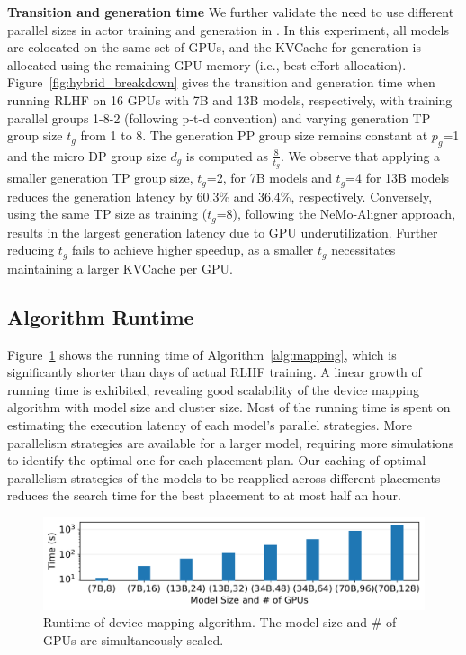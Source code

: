 \vspace{0.5mm}
\noindent \textbf{%
Transition and generation time}
We further validate the need to use different parallel sizes in actor training and generation in \sysname{}. In this experiment, all models are colocated on the same set of GPUs, and the KVCache for generation is allocated using the remaining GPU memory (i.e., best-effort allocation).
Figure~\ref{fig:hybrid_breakdown} gives the transition and generation time when running RLHF on 16 GPUs with 7B and 13B models, respectively, with training parallel groups 1-8-2 (following p-t-d convention) and varying generation TP group size $t_g$ from 1 to 8. 
The generation PP group size remains constant at $p_g$=1 and the micro DP group size $d_g$ is computed as $\frac{8}{t_g}$.
We observe that applying a smaller generation TP group size, $t_g$=2, for 7B models and $t_g$=4 for 13B models reduces the generation latency by 60.3\% and 36.4\%, respectively.
Conversely, using the same TP size as training ($t_g$=8), following the NeMo-Aligner approach, results in the largest generation latency due to GPU underutilization.
Further reducing $t_g$ fails to achieve higher speedup, as a smaller $t_g$ 
necessitates maintaining a larger KVCache per GPU.







\vspace{-1mm}
\subsection{Algorithm Runtime}
Figure~\ref{fig:exp_algo_time} shows the running time of Algorithm~\ref{alg:mapping}, 
which is significantly shorter than days of actual RLHF training. %
A linear growth of running time is exhibited, revealing good scalability of the device mapping algorithm with %
model size and cluster size. Most of the running time is spent on estimating the execution latency of each model's parallel strategies. More parallelism strategies are available for a larger model, requiring more simulations to identify the optimal one for each placement plan. %
Our caching of optimal parallelism strategies of the models to be reapplied across different placements reduces the search time for the best placement %
to at most half an hour.






\begin{figure}[t]
    \centering
    \includegraphics[width=.95\linewidth]{figs/algo_time.pdf}
    \vspace{-3mm}
    \caption{Runtime of device mapping algorithm. The model size and \# of GPUs are simultaneously scaled.}
    \label{fig:exp_algo_time}
    \vspace{-4mm}
\end{figure}
